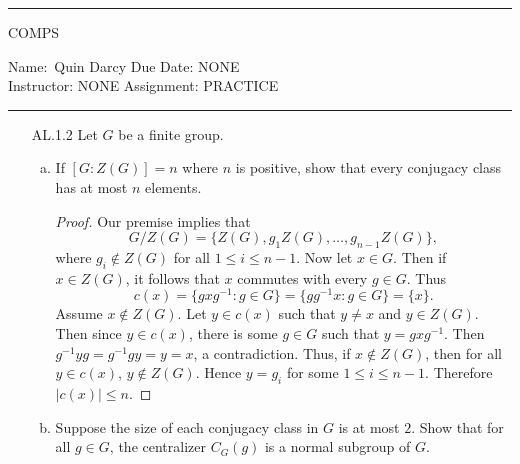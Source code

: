 \documentclass[12pt]{article}
\begin{document}
    \thispagestyle{empty}\hrule

    \begin{center}
        \vspace{.4cm} { \large COMPS}
    \end{center}
    {Name:\ Quin Darcy \hspace{\fill} Due Date: NONE   \\
    { Instructor:} NONE \hspace{\fill} Assignment:
    PRACTICE \\ \hrule}

    \begin{enumerate}
        \item[AL.1.2] Let $G$ be a finite group. 
            \begin{enumerate}[(a)]
                \item If $[G:Z(G)]=n$ where $n$ is positive, show that every
                    conjugacy class has at most $n$ elements. 
                    \begin{proof}
                        Our premise implies that 
                        \begin{equation*}
                            G/Z(G)=\{Z(G), g_1Z(G), \dots, g_{n-1}Z(G)\},
                        \end{equation*}
                        where $g_i\notin Z(G)$ for all $1\leq i\leq n-1$. Now
                        let $x\in G$. Then if $x\in Z(G)$, it follows that $x$
                        commutes with every $g\in G$. Thus 
                        \begin{equation*}
                            c(x)=\{gxg^{-1}:g\in G\}=\{gg^{-1}x:g\in G\}=\{x\}.
                        \end{equation*}
                        Assume $x\notin Z(G)$. Let $y\in c(x)$ such that $y\neq
                        x$ and $y\in Z(G)$. Then since $y\in c(x)$, there is
                        some $g\in G$ such that $y=gxg^{-1}$. Then
                        $g^{-1}yg=g^{-1}gy=y=x$, a contradiction. Thus, if
                        $x\notin Z(G)$, then for all $y\in c(x)$, $y\notin
                        Z(G)$. Hence $y=g_i$ for some $1\leq i\leq n-1$.
                        Therefore $|c(x)|\leq n$.   
                    \end{proof}
                \item Suppose the size of each conjugacy class in $G$ is at
                    most $2$. Show that for all $g\in G$, the centralizer
                    $C_G(g)$ is a normal subgroup of $G$.

\end{enumerate}
\end{enumerate}
\end{document}

